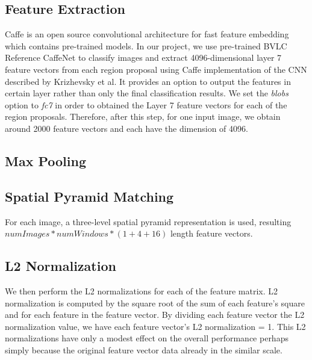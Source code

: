 \subsection{Feature Extraction}
Caffe\cite{Jia:2014:Caffe} is an open source convolutional architecture for
fast feature embedding which contains pre-trained models.
In our project, we use pre-trained BVLC Reference CaffeNet to classify images
and extract 4096-dimensional layer 7 feature vectors from each region
proposal using Caffe\cite{Jia:2014:Caffe} implementation of the CNN described by
Krizhevsky et al\cite{Krizhevsky:2012:ICD}. It provides an option to output the
features in certain layer rather than only the final classification results. We
set the \textit{blobs} option to \textit{fc7} in order to obtained the Layer
7 feature vectors for each of the region proposals. Therefore, after this step,
for one input image, we obtain around 2000 feature vectors and each have the
dimension of 4096.

\subsection{Max Pooling}

\subsection{Spatial Pyramid Matching}
For each image, a three-level spatial pyramid representation is used, resulting
$numImages * numWindows * (1 + 4 + 16)$ length feature vectors.

\subsection{L2 Normalization}
We then perform the L2 normalizations for each of the feature matrix.
L2 normalization is computed by the square root of the sum of each feature's
square and for each feature in the feature vector. By dividing each feature
vector the L2 normalization value, we have each feature vector's
L2 normalization = 1. This L2 normalizations have only a modest effect on the
overall performance perhaps simply because the original feature vector data
already in the similar scale.

